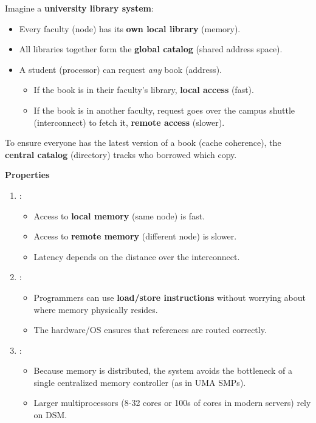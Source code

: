 \highspace
\begin{examplebox}
    Imagine a \textbf{university library system}:
    \begin{itemize}
        \item Every faculty (node) has its \textbf{own local library} (memory).
        \item All libraries together form the \textbf{global catalog} (shared address space).
        \newpage
        \item A student (processor) can request \emph{any} book (address).
        \begin{itemize}
            \item If the book is in their faculty's library, \textbf{local access} (fast).
            \item If the book is in another faculty, request goes over the campus shuttle (interconnect) to fetch it, \textbf{remote access} (slower).
        \end{itemize}
    \end{itemize}
    To ensure everyone has the latest version of a book (cache coherence), the \textbf{central catalog} (directory) tracks who borrowed which copy.
\end{examplebox}

\highspace
\begin{flushleft}
    \textcolor{Green3}{ \textbf{Properties}}
\end{flushleft}
\begin{enumerate}
    \item {}:
    \begin{itemize}
        \item Access to \textbf{local memory} (same node) is fast.
        \item Access to \textbf{remote memory} (different node) is slower.
        \item Latency depends on the distance over the interconnect.
    \end{itemize}
    \item {}:
    \begin{itemize}
        \item Programmers can use \textbf{load/store instructions} without worrying about where memory physically resides.
        \item The hardware/OS ensures that references are routed correctly.
    \end{itemize}
    \item {}:
    \begin{itemize}
        \item Because memory is distributed, the system avoids the bottleneck of a single centralized memory controller (as in UMA SMPs).
        \item Larger multiprocessors (8-32 cores or 100s of cores in modern servers) rely on DSM.
    \end{itemize}
\end{enumerate}

